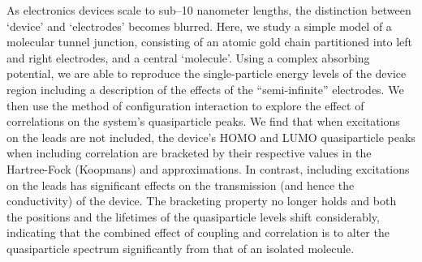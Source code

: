 As electronics devices scale to sub--10 nanometer lengths, the distinction
between `device' and `electrodes' becomes blurred.
Here, we study a simple model of a molecular tunnel junction, consisting
of an atomic gold chain partitioned into left and right electrodes, and a
central `molecule'.
Using a complex absorbing potential, we are able to reproduce the
single-particle energy levels of the device region including a description
of the effects of the ``semi-infinite'' electrodes.
We then use the method of configuration interaction to explore the effect
of correlations on the system's quasiparticle peaks.
We find that when excitations on the leads are not included, the device's
\ac{HOMO} and \ac{LUMO} quasiparticle peaks when including correlation
are bracketed by their respective values in the Hartree-Fock (Koopmans)
and \dscf approximations.
In contrast, including excitations on the leads has significant effects
on the transmission (and hence the conductivity) of the device. The
bracketing property no longer holds and both the positions and the lifetimes
of the quasiparticle levels shift considerably, indicating that the
combined effect of coupling and correlation is to alter the quasiparticle
spectrum significantly from that of an isolated molecule.
